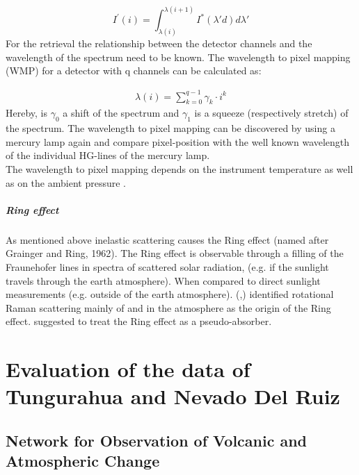 \documentclass  [
  paper    = a4,
  BCOR     = 10mm,
  twoside,
  fontsize = 12pt,
  fleqn,
  toc      = bibnumbered,
  toc      = listofnumbered,
  numbers  = noendperiod,
  headings = normal,
  listof   = leveldown,
  version  = 3.03
]                                       {scrreprt}
\begin{document}
	\begin{equation}
	I^{'}\left(i\right) = \int_{\lambda(i)}^{\lambda(i+1)}I^{*}\left(\lambda{'}d\right)d\lambda{'}
	\end{equation}
	For the retrieval the relationship between the detector channels and the wavelength of the spectrum need to be known.
	The wavelength to pixel mapping (WMP) for a detector with q channels can be calculated as:

	\begin{eqnarray}
	\lambda(i) = \sum_{k=0}^{q-1}\gamma_{k}\cdot i^{k}
	\end{eqnarray}
	Hereby, is $\gamma_{0}$ a shift of the spectrum and $\gamma_{1}$ is a squeeze (respectively stretch) of the spectrum.
	The wavelength to pixel mapping can be discovered by using a mercury lamp again and compare pixel-position with the well known wavelength of the individual HG-lines of the mercury lamp.\\
	The wavelength to pixel mapping depends on the instrument temperature as well as on the ambient pressure \citep{lubcke2014bro}.
	\subsubsection*{Ring effect}
	As mentioned above inelastic scattering causes the Ring effect (named after Grainger and Ring, 1962).
	The Ring effect is observable through a filling of the Fraunehofer lines in spectra of scattered solar radiation, (e.g. if the sunlight travels through the earth atmosphere). When compared to direct sunlight measurements (e.g. outside of the earth atmosphere).
	(\cite{bussemer1993ring},\cite{solomon1987interpretation}) identified rotational Raman scattering mainly of
	 and  in the atmosphere as the origin of the Ring effect.
	\cite{solomon1987interpretation} suggested to treat the Ring effect as a pseudo-absorber. 


	
	\part{Evaluation of the data of Tungurahua and Nevado Del Ruiz}
	
	
	\chapter{Network for Observation of Volcanic and Atmospheric Change \label{NOVAC}}

	
	
\end{document}
